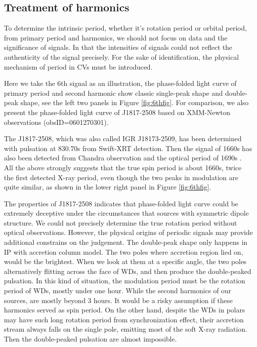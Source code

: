 \documentclass[twoside,twocolumn]{aastex63}
\begin{document}
\subsection{Treatment of harmonics}\label{harmonics}

To determine the intrinsic period, whether it's rotation period or orbital period, from primary period and harmonics, we should not focus on data and the significance of signals. In that the intensities of signals could not reflect the authenticity of the signal precisely. For the sake of  identification, the physical mechanism of period in CVs must be introduced. 

Here we take the 6th signal as an illustration, the phase-folded light curve of primary period and second harmonic show classic  single-peak shape and double-peak shape, see the left two panels in Figure \ref{fig:6thfig}. For comparison, we also present the phase-folded light curve of J1817-2508 based on XMM-Newton observations (obsID=0601270301).

 The J1817-2508, which was also called IGR J18173-2509, has been determined with pulsation at 830.70s from Swift-XRT detection. Then the signal of 1660s has also been detected from Chandra observation \citep{2009ATel.2354....1N} and the optical period of 1690s \citep{2012A&A...542A..22B}. All the above strongly suggests that the true spin period is about 1660s, twice the first detected X-ray period, even though the two peaks in modulation are quite similar, as shown in the lower right panel in Figure \ref{fig:6thfig}.
 
 The properties of J1817-2508 indicates that phase-folded light curve could be extremely deceptive under the circumstances that sources with symmetric dipole structure. We could not precisely determine the true rotation period without optical observations. However, the physical origins of periodic signals may provide additional constrains on the judgement. The double-peak shape only happens in IP with accretion column model. The two poles where accretion region lied on, would be the brightest. When we look at them at a specific angle, the two poles alternatively flitting across the face of WDs, and then produce the double-peaked pulsation. In this kind of situation, the modulation period must be the rotation period of WDs, mostly under one hour. While the second harmonics of our sources, are mostly beyond 3 hours. It would be a risky assumption if these harmonics served as spin period. On the other hand, despite the WDs in polars may have such long rotation period from synchronization effect, their accretion stream always falls on the single pole, emitting most of the soft X-ray radiation. Then the double-peaked pulsation are almost impossible. 
 
\end{document}
